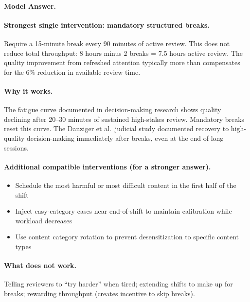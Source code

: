 \paragraph{Model Answer.}

\paragraph{Strongest single intervention: mandatory structured breaks.}

Require a 15-minute break every 90 minutes of active review. This does not reduce total throughput: 8 hours minus 2 breaks = 7.5 hours active review. The quality improvement from refreshed attention typically more than compensates for the 6\% reduction in available review time.

\paragraph{Why it works.}

The fatigue curve documented in decision-making research shows quality declining after 20--30 minutes of sustained high-stakes review. Mandatory breaks reset this curve. The Danziger et al.\ judicial study documented recovery to high-quality decision-making immediately after breaks, even at the end of long sessions.

\paragraph{Additional compatible interventions (for a stronger answer).}
\begin{itemize}
    \item Schedule the most harmful or most difficult content in the first half of the shift
    \item Inject easy-category cases near end-of-shift to maintain calibration while workload decreases
    \item Use content category rotation to prevent desensitization to specific content types
\end{itemize}

\paragraph{What does not work.}

Telling reviewers to ``try harder'' when tired; extending shifts to make up for breaks; rewarding throughput (creates incentive to skip breaks).

